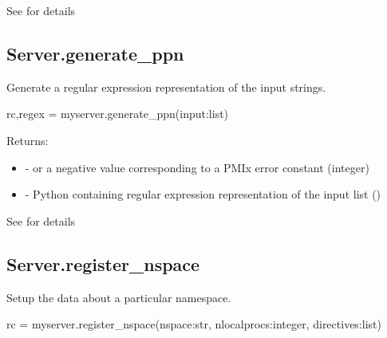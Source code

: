 See  for details


\subsection{Server.generate_ppn}

\summary
Generate a regular expression representation of the input strings.

\format

\pyspecificstart
\begin{codepar}
rc,regex = myserver.generate_ppn(input:list)
\end{codepar}
\pyspecificend


\begin{arglist}
\end{arglist}

Returns:

\begin{itemize}
    \item {} -  or a negative value corresponding to a PMIx error constant (integer)
    \item {} - Python  containing regular expression representation of the input list ()
\end{itemize}


See  for details


\subsection{Server.register_nspace}

\summary Setup the data about a particular namespace.

\format

\pyspecificstart
\begin{codepar}
rc = myserver.register_nspace(nspace:str,
                              nlocalprocs:integer,
                              directives:list)
\end{codepar}
\pyspecificend


\begin{arglist}
\end{arglist}


